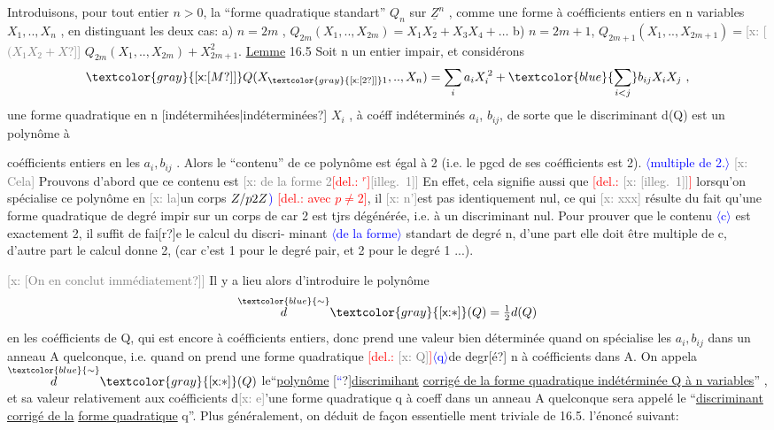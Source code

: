 \documentclass[11pt]{article}
\newcommand{\scanpage}[1]{\par\bigskip\noindent{\small\sffamily[scan #1]}\par}
\newcommand{\mspage}[1]{{\small\sffamily[p.\,#1]}}
\newcommand{\hand}[1]{\textcolor{blue}{#1}}
\let\over\relax
\newcommand{\over}[2]{\textcolor{gray}{#1}\textcolor{blue}{\ensuremath{^{\!\nearrow}}#2}}
\newcommand{\inserted}[2][]{\textcolor{blue}{$\langle$#2$\rangle$}}
\newcommand{\deleted}[1]{\textcolor{red}{[\textsf{del.:} #1]}}
\newcommand{\xout}[1]{\textcolor{gray}{[\textsf{x:} #1]}}
\newcommand{\uline}[1]{\underline{#1}}
\newcommand{\unsure}[1]{[#1?]}
\newcommand{\illegible}[1]{[\textsf{illeg.\ #1}]}
\begin{document}
Introduisons, pour tout entier  $n>0$, la ``forme quadratique standart''
$Q_n$ sur $\underline{Z}^n$ , comme une forme à coéfficients entiers en n variables
$X_1,..,X_n$ ,  en distinguant les deux cas:
a)  $n = 2m$  ,  $Q_{2m}(X_1,..,X_{2m}) = X_1X_2 + X_3X_4 + \ldots$
b)  $n = 2m+1$,  $Q_{2m+1}(X_1,..,X_{2m+1}) =$\xout{\unsure{$(X_1X_2+X$}} $Q_{2m}(X_1,..,X_{2m}) + X_{2m+1}^2$.
\uline{Lemme} 16.5  Soit n un entier impair, et considérons
\[ \xout{\unsure{M}}Q(X_{\xout{\unsure{2}}1},..,X_n) = \sum_i a_iX_i^{\,2} + \hand{\sum_{i<j}} b_{ij}X_iX_j \ , \]
une forme quadratique en n \unsure{indétermihées|indéterminées} $X_i$ , à coéff indéterminés
$a_i$, $b_{ij}$, de sorte que le discriminant  d(Q)  est un polynôme à

\mspage{\hand{175}}

\clearpage
\scanpage{25/176}
\mspage{\hand{8}}

coéfficients entiers en les $a_i,b_{ij}$ . Alors le ``contenu'' de ce polynôme
est égal à 2 (i.e. le pgcd de ses coéfficients est 2).
\inserted[typed]{multiple de 2.}
\xout{Cela} Prouvons d'abord que ce contenu est \xout{de la forme 2\deleted{$^r$}\illegible{1}}
En effet, cela signifie aussi que \deleted{\xout{\illegible{1}}} lorsqu'on spécialise ce polynôme
en \xout{la}un corps $Z/\over{p}{2}Z$\hand{)} \deleted{avec $p\neq 2$}, il \xout{n'}est pas identiquement nul, ce qui \xout{xxx}
résulte du fait qu'une forme quadratique de degré imp\over{q}{a}ir sur un corps de
car 2 est tjrs dégénérée, i.e. à un discriminant nul. Pour prouver
que le contenu \inserted{c} est exactement 2, il suffit de fai\unsure{r}e le calcul du discri-%
minant \inserted{de la forme} standart de degré n, d'une part elle doit être multiple de c,
d'autre part le calcul donne 2, (car c'est 1 pour le degré pair, et 2 pour
le degré 1 ...).

\xout{\unsure{On en conclut immédiatement}} Il y a lieu alors d'introduire le polynôme
\[ \overset{\hand{\sim}}{d}\xout{*}(Q) = \tfrac{1}{2}d(Q) \]
en les coéfficients de Q, qui est encore à coéfficients entiers, donc
prend une valeur bien déterminée quand on spécialise les $a_i,b_{ij}$ dans un
anneau A quelconque, i.e. quand on prend une forme quadratique \deleted{\xout{Q}}\inserted{q}de degr\unsure{é}
n à coéfficients dans A. On appela $\overset{\hand{\sim}}{d}\xout{*}(Q)$ le``\uline{polynôme} \unsure{\hand{``}}\uline{discrimihant}
\uline{corrigé de la forme quadratique indétérminée Q à n variables}'' , et sa
valeur relativement aux coéfficients d\xout{e}'une forme quadratique q à coeff
dans un anneau A quelconque sera appelé le ``\uline{discriminant corrigé de la}
\uline{forme quadratique} q''. Plus généralement, on déduit de façon essentielle
ment triviale de 16.5. l'énoncé suivant:
\end{document}
